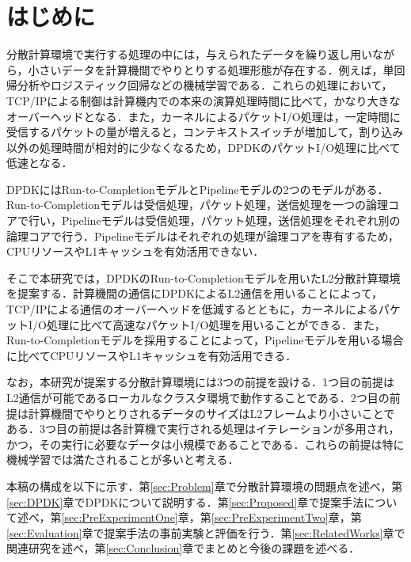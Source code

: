 \section{はじめに}
\label{sec:Background}
分散計算環境で実行する処理の中には，与えられたデータを繰り返し用いながら，小さいデータを計算機間でやりとりする処理形態が存在する．例えば，単回帰分析やロジスティック回帰などの機械学習である．これらの処理において，TCP/IPによる制御は計算機内での本来の演算処理時間に比べて，かなり大きなオーバーヘッドとなる．また，カーネルによるパケットI/O処理は，一定時間に受信するパケットの量が増えると，コンテキストスイッチが増加して，割り込み以外の処理時間が相対的に少なくなるため，DPDKのパケットI/O処理に比べて低速となる．

DPDKにはRun-to-CompletionモデルとPipelineモデルの2つのモデルがある．Run-to-Completionモデルは受信処理，パケット処理，送信処理を一つの論理コアで行い，Pipelineモデルは受信処理，パケット処理，送信処理をそれぞれ別の論理コアで行う．Pipelineモデルはそれぞれの処理が論理コアを専有するため，CPUリソースやL1キャッシュを有効活用できない．

そこで本研究では，DPDKのRun-to-Completionモデルを用いたL2分散計算環境を提案する．計算機間の通信にDPDKによるL2通信を用いることによって，TCP/IPによる通信のオーバーヘッドを低減するとともに，カーネルによるパケットI/O処理に比べて高速なパケットI/O処理を用いることができる．また，Run-to-Completionモデルを採用することによって，Pipelineモデルを用いる場合に比べてCPUリソースやL1キャッシュを有効活用できる．

なお，本研究が提案する分散計算環境には3つの前提を設ける．1つ目の前提はL2通信が可能であるローカルなクラスタ環境で動作することである．2つ目の前提は計算機間でやりとりされるデータのサイズはL2フレームより小さいことである．3つ目の前提は各計算機で実行される処理はイテレーションが多用され，かつ，その実行に必要なデータは小規模であることである．これらの前提は特に機械学習では満たされることが多いと考える．

本稿の構成を以下に示す．第\ref{sec:Problem}章で分散計算環境の問題点を述べ，第\ref{sec:DPDK}章でDPDKについて説明する．第\ref{sec:Proposed}章で提案手法について述べ，第\ref{sec:PreExperimentOne}章，第\ref{sec:PreExperimentTwo}章，第\ref{sec:Evaluation}章で提案手法の事前実験と評価を行う．第\ref{sec:RelatedWorks}章で関連研究を述べ，第\ref{sec:Conclusion}章でまとめと今後の課題を述べる．
